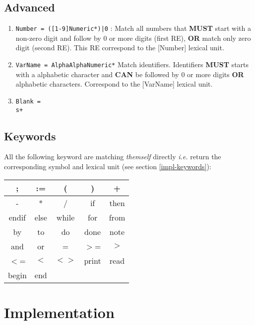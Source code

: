 \documentclass[letterpaper]{article}
\begin{document}
\subsection{Advanced}
\label{advanced-ere}
\begin{enumerate}
    \item \texttt{Number = ([1-9]{Numeric}*)|0} :
    Match all numbers that \textbf{MUST} start with a non-zero digit and follow
    by 0 or more digits (first RE),
    \textbf{OR} match only zero digit (second RE). This RE correspond to
    the [Number] lexical unit.
    \item \texttt{VarName = {Alpha}{AlphaNumeric}*}
    Match identifiers. Identifiers \textbf{MUST} starts with a alphabetic
    character and \textbf{CAN} be followed by 0 or more digits \textbf{OR}
    alphabetic characters.
    Correspond to the [VarName] lexical unit.
    \item \texttt{Blank = \\s+}
\end{enumerate}

\subsection{Keywords}

\label{ere-keywords}

All the following keyword are matching \textit{themself} directly \textit{i.e.}
return the corresponding symbol and lexical unit
(see section \ref{impl-keywords}):\\

\begin{tabular}{|c|c|c|c|c|}
    \hline
    ; & := & ( & )  & + \\
    \hline
    - & *  & / & if & then \\
    \hline
    endif & else & while & for & from \\
    \hline
    by & to & do & done & note \\
    \hline
    and & or & = & $>$= & $>$ \\
    \hline
    $<$= & $<$ & $<>$ & print & read \\
    \hline
    begin & end & & &  \\
    \hline
\end{tabular}



\section{Implementation}
\end{document}
